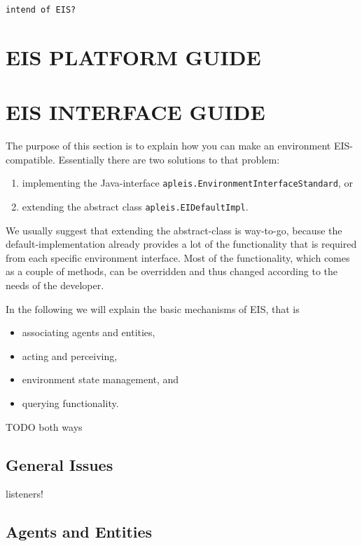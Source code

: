 \documentclass[a4]{article}
\newcommand{\EIS}{\textsf{EIS}\xspace}
\begin{document}
\begin{verbatim}
intend of EIS?
\end{verbatim}


\section{EIS PLATFORM GUIDE}


\section{EIS INTERFACE GUIDE}

The purpose of this section is to explain how you can make an environment \EIS-compatible. 
Essentially there are two solutions to that problem:
\begin{enumerate}
\item implementing the Java-interface \texttt{apleis.EnvironmentInterfaceStandard}, or
\item extending the abstract class \texttt{apleis.EIDefaultImpl}.
\end{enumerate}

We usually suggest that extending the abstract-class is way-to-go, because the default-implementation
already provides a lot of the functionality that is required from each specific environment interface.
Most of the functionality, which comes as a couple of methods, can be overridden and thus changed
according to the needs of the developer.

In the following we will explain the basic mechanisms of \EIS, that is
\begin{itemize}
\item associating agents and entities,
\item acting and perceiving,
\item environment state management, and
\item querying functionality.
\end{itemize}

TODO both ways

\subsection{General Issues}

listeners!

\subsection{Agents and Entities}
\end{document}

